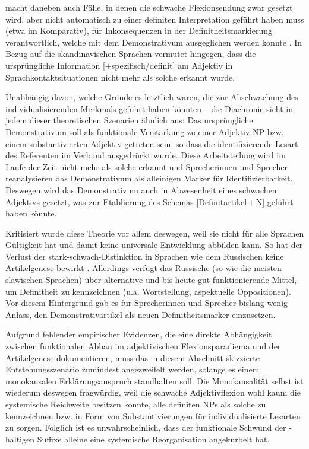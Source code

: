 \textcite[44]{Ebert1978} macht daneben \parencite[mit Verweis auf][]{Kuhn1955} auch Fälle, in denen die schwache Flexionsendung zwar gesetzt wird, aber nicht automatisch zu einer definiten Interpretation geführt haben muss (etwa im Komparativ), für Inkonsequenzen in der Definitheitsmarkierung verantwortlich, welche mit dem Demonstrativum ausgeglichen werden konnte \parencite[vgl. zu dieser Argumentation auch][25]{Kovari1984}. In Bezug auf die skandinavischen Sprachen vermutet \textcite{Braunmuller2013} hingegen, dass die ursprüngliche Information [+spezifisch/definit] am Adjektiv in Sprachkontaktsituationen nicht mehr als solche erkannt wurde. 

Unabhängig davon, welche Gründe es letztlich waren, die zur Abschwächung des individualisierenden Merkmals geführt haben könnten -- die Diachronie sieht in jedem dieser theoretischen Szenarien ähnlich aus: Das ursprüngliche Demonstrativum soll als funktionale Verstärkung zu einer Adjektiv-NP bzw. einem substantivierten Adjektiv getreten sein, so dass die identifizierende Lesart des Referenten im Verbund ausgedrückt wurde. Diese Arbeitsteilung wird im Laufe der Zeit nicht mehr als solche erkannt und Sprecherinnen und Sprecher reanalysieren das Demonstrativum als alleinigen Marker für Identifizierbarkeit. Deswegen wird das Demonstrativum auch in Abwesenheit eines schwachen Adjektivs gesetzt, was zur Etablierung des Schemas [Definitartikel\,+\,N] geführt haben könnte.     

Kritisiert wurde diese Theorie vor allem deswegen, weil sie nicht für alle Sprachen Gültigkeit hat und damit keine universale Entwicklung abbilden kann. So hat der Verlust der stark-schwach-Distinktion in Sprachen wie dem Russischen keine Artikelgenese bewirkt \parencite[][64]{Philippi1997}. Allerdings verfügt das Russische (so wie die meisten slawischen Sprachen) über alternative und bis heute gut funktionierende Mittel, um Definitheit zu kennzeichnen (u.a. Wortstellung, aspektuelle Oppositionen). Vor diesem Hintergrund gab es für Sprecherinnen und Sprecher bislang wenig Anlass,  den Demonstrativartikel als neuen Definitheitsmarker einzusetzen.

Aufgrund fehlender empirischer Evidenzen, die eine direkte Abhängigkeit zwischen funktionalen Abbau im adjektivischen Flexionsparadigma und der Artikelgenese dokumentieren, muss das in diesem Abschnitt skizzierte Entstehungsszenario  zumindest angezweifelt werden, solange es einem monokausalen Erklärungsanspruch standhalten soll. Die Monokausalität selbst ist wiederum deswegen fragwürdig, weil  die schwache Adjektivflexion wohl kaum die systemische Reichweite besitzen konnte,  alle definiten NPs als solche zu kennzeichnen bzw. in Form von Substantivierungen  für individualisierte Lesarten zu sorgen. Folglich ist es unwahrscheinlich, dass der funktionale Schwund der -haltigen Suffixe alleine eine systemische Reorganisation angekurbelt hat. 

